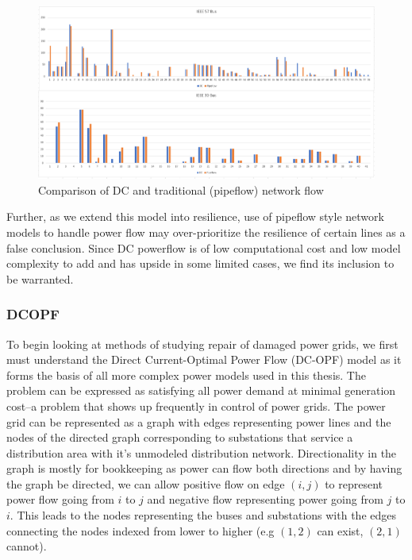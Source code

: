 \documentclass{article}
\begin{document}
	\begin{figure}
		\centering
		\includegraphics[width=\linewidth]{DCvsPipeflow.PNG}
		\caption{Comparison of DC and traditional (pipeflow) network flow}
	\end{figure}
	
	Further, as we extend this model into resilience, use of pipeflow style network models to handle power flow may over-prioritize the resilience of certain lines as a false conclusion. Since DC powerflow is of low computational cost and low model complexity to add and has upside in some limited cases, we find its inclusion to be warranted.
	\subsubsection{DCOPF}
		To begin looking at methods of studying repair of damaged power grids, we first must understand the Direct Current-Optimal Power Flow (DC-OPF) model as it forms the basis of all more complex power models used in this thesis. The problem can be expressed as satisfying all power demand at minimal generation cost--a problem that shows up frequently in control of power grids. The power grid can be represented as a graph with edges representing power lines and the nodes of the directed graph corresponding to substations that service a distribution area with it's unmodeled distribution network. Directionality in the graph is mostly for bookkeeping as power can flow both directions and by having the graph be directed, we can allow positive flow on edge $(i,j)$ to represent power flow going from $i$ to $j$ and negative flow representing power going from $j$ to $i$. This leads to the nodes representing the buses and substations with the edges connecting the nodes indexed from lower to higher (e.g $(1,2)$ can exist, $(2,1)$ cannot).
		
\end{document}
